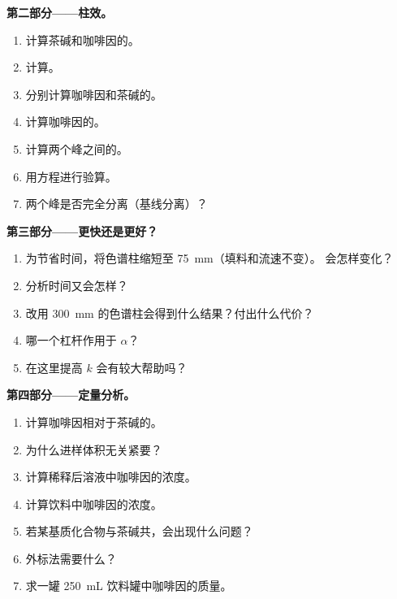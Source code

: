 \begin{problem}
\medskip
\noindent\textbf{第二部分——柱效。}
\begin{enumerate}[resume]
  \item 计算茶碱和咖啡因的。
  \item 计算。
  \item 分别计算咖啡因和茶碱的。
  \item 计算咖啡因的。
  \item 计算两个峰之间的。
  \item 用方程进行验算。
  \item 两个峰是否完全分离（基线分离）？
\end{enumerate}

\medskip
\noindent\textbf{第三部分——更快还是更好？}
\begin{enumerate}[resume]
  \item 为节省时间，将色谱柱缩短至 \qty{75}{mm}（填料和流速不变）。
        会怎样变化？
  \item 分析时间又会怎样？
  \item 改用 \qty{300}{mm} 的色谱柱会得到什么结果？付出什么代价？
  \item 哪一个杠杆作用于 $\alpha$？
  \item 在这里提高 $k$ 会有较大帮助吗？
\end{enumerate}

\medskip
\noindent\textbf{第四部分——定量分析。}
\begin{enumerate}[resume]
  \item 计算咖啡因相对于茶碱的。
  \item 为什么进样体积无关紧要？
  \item 计算稀释后溶液中咖啡因的浓度。
  \item 计算饮料中咖啡因的浓度。
  \item 若某基质化合物与茶碱共，会出现什么问题？
  \item 外标法需要什么？
  \item 求一罐 \qty{250}{mL} 饮料罐中咖啡因的质量。
\end{enumerate}
\end{problem}

